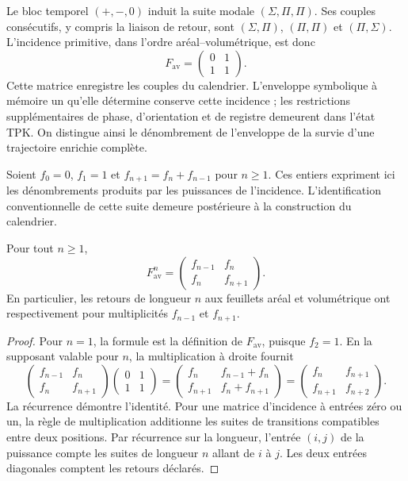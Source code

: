 Le bloc temporel \((+,-,0)\) induit la suite modale \((\Sigma,\Pi,\Pi)\). Ses couples consécutifs, y compris la liaison de retour, sont \((\Sigma,\Pi)\), \((\Pi,\Pi)\) et \((\Pi,\Sigma)\). L’incidence primitive, dans l’ordre aréal--volumétrique, est donc
\begin{equation}
 F_{\mathrm{av}}=
 \begin{pmatrix}0&1\\1&1\end{pmatrix}.
 \label{hrr:incidencia-matriz}
\end{equation}
Cette matrice enregistre les couples du calendrier. L’enveloppe symbolique à mémoire un qu’elle détermine conserve cette incidence ; les restrictions supplémentaires de phase, d’orientation et de registre demeurent dans l’état TPK. On distingue ainsi le dénombrement de l’enveloppe de la survie d’une trajectoire enrichie complète.

Soient \(f_0=0\), \(f_1=1\) et \(f_{n+1}=f_n+f_{n-1}\) pour \(n\geq1\). Ces entiers expriment ici les dénombrements produits par les puissances de l’incidence. L’identification conventionnelle de cette suite demeure postérieure à la construction du calendrier.

\begin{proposition}
\label{hrr:potencias}
Pour tout \(n\geq1\),
\begin{equation}
 F_{\mathrm{av}}^n=
 \begin{pmatrix}f_{n-1}&f_n\\f_n&f_{n+1}\end{pmatrix}.
 \label{hrr:potencias-formula}
\end{equation}
En particulier, les retours de longueur \(n\) aux feuillets aréal et volumétrique ont respectivement pour multiplicités \(f_{n-1}\) et \(f_{n+1}\).
\end{proposition}
\begin{proof}
Pour \(n=1\), la formule est la définition de \(F_{\mathrm{av}}\), puisque \(f_2=1\). En la supposant valable pour \(n\), la multiplication à droite fournit
\[
 \begin{pmatrix}f_{n-1}&f_n\\f_n&f_{n+1}\end{pmatrix}
 \begin{pmatrix}0&1\\1&1\end{pmatrix}
 =\begin{pmatrix}f_n&f_{n-1}+f_n\\
 f_{n+1}&f_n+f_{n+1}\end{pmatrix}
 =\begin{pmatrix}f_n&f_{n+1}\\f_{n+1}&f_{n+2}\end{pmatrix}.
\]
La récurrence démontre l’identité. Pour une matrice d’incidence à entrées zéro ou un, la règle de multiplication additionne les suites de transitions compatibles entre deux positions. Par récurrence sur la longueur, l’entrée \((i,j)\) de la puissance compte les suites de longueur \(n\) allant de \(i\) à \(j\). Les deux entrées diagonales comptent les retours déclarés.
\end{proof}


